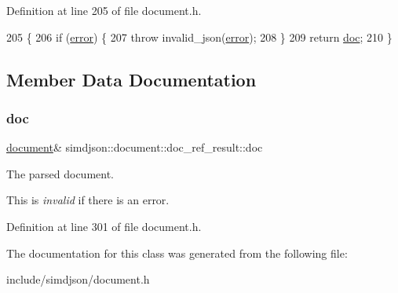 Definition at line 205 of file document.\+h.


\begin{DoxyCode}
205                                                                   \{
206   \textcolor{keywordflow}{if} (\hyperlink{classsimdjson_1_1document_1_1doc__ref__result_a779ace3a575c5962a9819314d9cabfc9}{error}) \{
207     \textcolor{keywordflow}{throw} invalid\_json(\hyperlink{classsimdjson_1_1document_1_1doc__ref__result_a779ace3a575c5962a9819314d9cabfc9}{error});
208   \}
209   \textcolor{keywordflow}{return} \hyperlink{classsimdjson_1_1document_1_1doc__ref__result_ad51d8d8caeded41e300bb9b4713a6f96}{doc};
210 \}
\end{DoxyCode}


\subsection{Member Data Documentation}
\mbox{\label{classsimdjson_1_1document_1_1doc__ref__result_ad51d8d8caeded41e300bb9b4713a6f96}} 
\subsubsection{\texorpdfstring{doc}{doc}}
{\footnotesize\ttfamily \hyperlink{classsimdjson_1_1document}{document}\& simdjson\+::document\+::doc\+\_\+ref\+\_\+result\+::doc}



The parsed document. 

This is {\itshape invalid} if there is an error. 

Definition at line 301 of file document.\+h.



The documentation for this class was generated from the following file\+:\begin{DoxyCompactItemize}
\item 
include/simdjson/document.\+h\end{DoxyCompactItemize}
